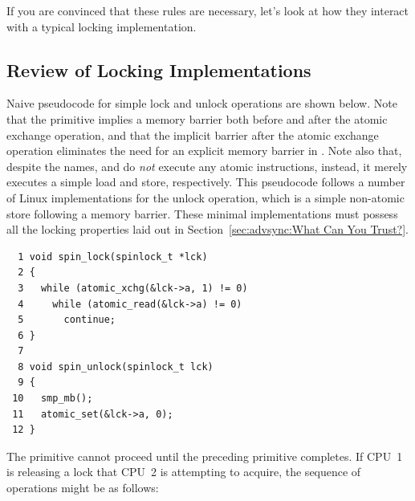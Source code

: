 If you are convinced that these rules are necessary, let's look at how
they interact with a typical locking implementation.

\subsection{Review of Locking Implementations}
\label{sec:advsync:Review of Locking Implementations}

Naive pseudocode for simple lock and unlock operations are shown below.
Note that the  primitive implies a memory barrier
both before and after the atomic exchange operation, and that the
implicit barrier after the atomic exchange operation eliminates
the need for an explicit memory barrier in .
Note also that, despite the names,  and
 do \emph{not}
execute any atomic instructions, instead, it merely executes a
simple load and store, respectively.
This pseudocode follows a number of Linux implementations for
the unlock operation, which is a simple non-atomic store following a
memory barrier.
These minimal implementations must possess all the locking properties
laid out in Section~\ref{sec:advsync:What Can You Trust?}.

\vspace{5pt}
\begin{minipage}[t]{\columnwidth}
\scriptsize
\begin{verbatim}
  1 void spin_lock(spinlock_t *lck)
  2 {
  3   while (atomic_xchg(&lck->a, 1) != 0)
  4     while (atomic_read(&lck->a) != 0)
  5       continue;
  6 }
  7 
  8 void spin_unlock(spinlock_t lck)
  9 {
 10   smp_mb();
 11   atomic_set(&lck->a, 0);
 12 }
\end{verbatim}
\end{minipage}
\label{codesample:advsync:Naive Lock and Unlock Pseudocode}
\vspace{5pt}

The  primitive cannot proceed until
the preceding  primitive completes.
If CPU~1 is releasing a lock that CPU~2 is attempting to acquire,
the sequence of operations might be as follows:

